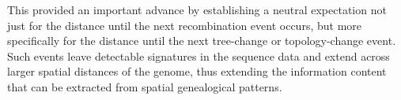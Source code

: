\documentclass[11pt]{article}
\begin{document}
This provided an important advance by establishing a neutral expectation 
not just for the distance until the next recombination event occurs, 
but more specifically for the distance until the next tree-change or 
topology-change event. Such events leave 
detectable signatures in the sequence data and extend across larger 
spatial distances of the genome, thus extending the information content
that can be extracted from spatial genealogical patterns.%






\end{document}
